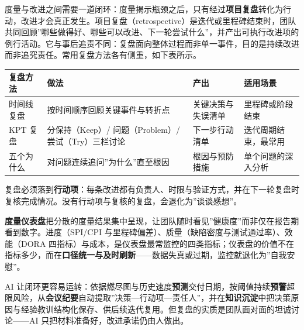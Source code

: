 \documentclass[12pt,a4paper,twoside,openany]{ctexbook}
\numberwithin{figure}{chapter}
\numberwithin{table}{chapter}
\newcounter{none}
\begin{document}
度量与改进之间需要一道闭环：度量揭示瓶颈之后，只有经过\textbf{项目复盘}转化为行动，改进才会真正发生。项目复盘（retrospective）是迭代或里程碑结束时，团队共同回顾''哪些做得好、哪些可以改进、下一轮尝试什么''，并产出可执行改进项的例行活动。它与事后追责不同：复盘面向整体过程而非单一事件，目的是持续改进而非追究责任。常用复盘方法各有侧重，如下表所示。

{\def\LTcaptype{none} %
\begin{longtable}[]{@{}
  >{\raggedright\arraybackslash}p{}
  >{\raggedright\arraybackslash}p{}
  >{\raggedright\arraybackslash}p{}
  >{\raggedright\arraybackslash}p{}@{}}
\toprule\noalign{}
\begin{minipage}[b]{\linewidth}\raggedright
复盘方法
\end{minipage} & \begin{minipage}[b]{\linewidth}\raggedright
做法
\end{minipage} & \begin{minipage}[b]{\linewidth}\raggedright
产出
\end{minipage} & \begin{minipage}[b]{\linewidth}\raggedright
适用场景
\end{minipage} \\
\midrule\noalign{}
\endhead
\bottomrule\noalign{}
\endlastfoot
时间线复盘 & 按时间顺序回顾关键事件与转折点 & 关键决策与失误清单 &
里程碑或阶段结束 \\
KPT 复盘 & 分保持（Keep）/ 问题（Problem）/ 尝试（Try）三栏讨论 &
下一步行动清单 & 迭代周期结束，最常用 \\
五个为什么 & 对问题连续追问''为什么''直至根因 & 根因与预防措施 &
单个问题的深入分析 \\
\end{longtable}
}

复盘必须落到\textbf{行动项}：每条改进都有负责人、时限与验证方式，并在下一轮复盘时复核完成情况。没有行动项与复核的复盘，会退化为''谈谈感想''。

\textbf{度量仪表盘}把分散的度量结果集中呈现，让团队随时看见''健康度''而非仅在报告期看到数字。进度（SPI/CPI
与里程碑偏差）、质量（缺陷密度与测试通过率）、效能（DORA
四指标）与成本，是仪表盘最常监控的四类指标；仪表盘的价值不在指标多少，而在\textbf{口径统一与及时刷新}------数据失真或过期，监控就退化为''自我安慰''。

AI
让闭环更容易运转：依据燃尽图与历史速度\textbf{预测}交付日期，按阈值持续\textbf{预警}超限风险，从\textbf{会议纪要}自动提取''决策---行动项---责任人''，并在\textbf{知识沉淀}中把决策原因与经验教训结构化保存、供后续迭代复用。但复盘的实质是团队面对面的坦诚讨论------AI
只把材料准备好，改进承诺仍由人做出。
\end{document}
